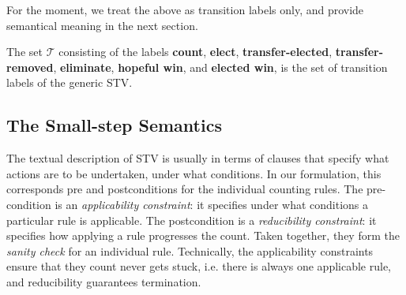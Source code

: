 \documentclass{llncs}
\begin{document}
\smallskip\noindent{}

\smallskip\noindent
For the moment, we treat the above as transition labels only, and
provide semantical meaning in the next section.

\begin{definition}\label{stv:trans}
The set $\mathcal{T}$ consisting of the labels \textbf{count}, \textbf{elect}, \textbf{transfer-elected}, \textbf{transfer-removed}, \textbf{eliminate}, \textbf{hopeful win}, and \textbf{elected win}, is the set of transition labels of the generic STV.
\end{definition}

\subsection{The Small-step Semantics}
The textual description of STV is usually in terms of clauses that
specify what actions are to be undertaken, under what conditions. In
our formulation, this corresponds pre and postconditions for the
individual counting rules. The pre-condition is an
\emph{applicability constraint}: it specifies under what conditions
a particular rule is applicable. The postcondition is a
\emph{reducibility constraint}: it specifies how applying a rule
progresses the count.  Taken together, they form the \emph{sanity
check} for an individual rule. Technically, the applicability
constraints ensure that they count never gets stuck, i.e. there is
always one applicable rule, and reducibility guarantees termination. 
\end{document}
